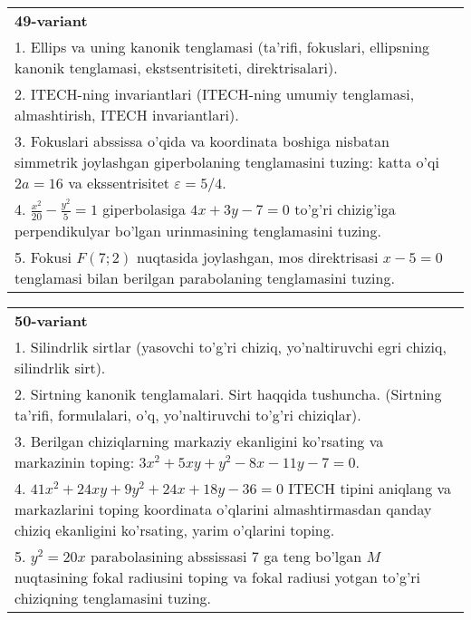 \documentclass{article}
\begin{document}
\begin{tabular}{m{17cm}}
\textbf{49-variant}\\
1. Ellips va uning kanonik tenglamasi (ta'rifi, fokuslari, ellipsning kanonik tenglamasi, ekstsentrisiteti, direktrisalari).\\

2. ITECH-ning invariantlari (ITECH-ning umumiy tenglamasi, almashtirish, ITECH invariantlari).\\

3. Fokuslari abssissa o'qida va koordinata boshiga nisbatan simmetrik joylashgan giperbolaning tenglamasini tuzing: katta o'qi $2a=16$ va ekssentrisitet $\varepsilon=5/4$.\\

4. $\frac{x^{2}}{20} - \frac{y^{2}}{5} = 1$ giperbolasiga $4x + 3y - 7 = 0$ to'g'ri chizig'iga perpendikulyar bo'lgan urinmasining tenglamasini tuzing.  \\

5. Fokusi $F(7;2)$ nuqtasida joylashgan, mos direktrisasi $x - 5 = 0$ tenglamasi bilan berilgan parabolaning tenglamasini tuzing.  
\end{tabular}
\vspace{1cm}


\begin{tabular}{m{17cm}}
\textbf{50-variant}\\
1. Silindrlik sirtlar (yasovchi to'g'ri chiziq, yo'naltiruvchi egri chiziq, silindrlik sirt).\\

2. Sirtning kanonik tenglamalari. Sirt haqqida tushuncha. (Sirtning ta'rifi, formulalari, o'q, yo'naltiruvchi to'g'ri chiziqlar).\\

3. Berilgan chiziqlarning markaziy ekanligini ko'rsating va markazinin toping: $3x^{2}+5xy+y^{2}-8x-11y-7=0$.\\

4. $41x^{2} + 24xy + 9y^{2} + 24x + 18y - 36 = 0$ ITECH tipini aniqlang va markazlarini toping koordinata o'qlarini almashtirmasdan qanday chiziq ekanligini ko'rsating, yarim o'qlarini toping.  \\

5. $y^{2} = 20x$ parabolasining abssissasi 7 ga teng bo'lgan $M$ nuqtasining fokal radiusini toping va fokal radiusi yotgan to'g'ri chiziqning tenglamasini tuzing.  
\end{tabular}
\vspace{1cm}
\end{document}
